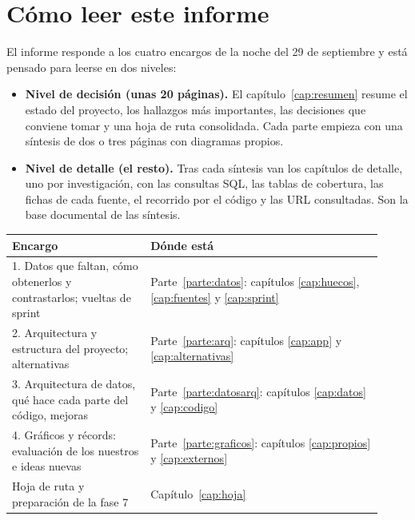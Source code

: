 \documentclass[11pt,openany]{report}
\begin{document}
\tableofcontents
\clearpage
{}

\chapter*{Cómo leer este informe}

El informe responde a los cuatro encargos de la noche del 29 de septiembre y está pensado para
leerse en dos niveles:

\begin{itemize}
  \item \textbf{Nivel de decisión (unas 20 páginas).} El capítulo~\ref{cap:resumen} resume el estado
  del proyecto, los hallazgos más importantes, las decisiones que conviene tomar y una hoja de ruta
  consolidada. Cada parte empieza con una síntesis de dos o tres páginas con diagramas propios.
  \item \textbf{Nivel de detalle (el resto).} Tras cada síntesis van los capítulos de detalle, uno por
  investigación, con las consultas SQL, las tablas de cobertura, las fichas de cada fuente, el
  recorrido por el código y las URL consultadas. Son la base documental de las síntesis.
\end{itemize}

\begin{center}\small
\begin{tabular}{@{}p{0.34\linewidth}p{0.58\linewidth}@{}}
\toprule
\textbf{Encargo} & \textbf{Dónde está} \\
\midrule
1. Datos que faltan, cómo obtenerlos y contrastarlos; vueltas de sprint & Parte~\ref{parte:datos}: capítulos \ref{cap:huecos}, \ref{cap:fuentes} y \ref{cap:sprint} \\
2. Arquitectura y estructura del proyecto; alternativas & Parte~\ref{parte:arq}: capítulos \ref{cap:app} y \ref{cap:alternativas} \\
3. Arquitectura de datos, qué hace cada parte del código, mejoras & Parte~\ref{parte:datosarq}: capítulos \ref{cap:datos} y \ref{cap:codigo} \\
4. Gráficos y récords: evaluación de los nuestros e ideas nuevas & Parte~\ref{parte:graficos}: capítulos \ref{cap:propios} y \ref{cap:externos} \\
Hoja de ruta y preparación de la fase 7 & Capítulo~\ref{cap:hoja} \\
\bottomrule
\end{tabular}
\end{center}
\end{document}

